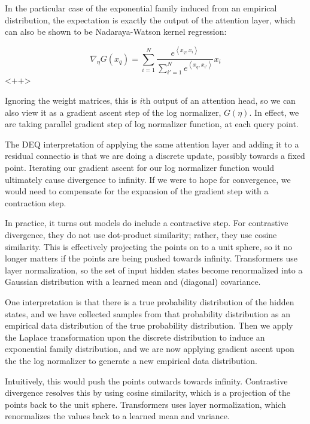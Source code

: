 \documentclass[a4paper]{article}
\begin{document}
In the particular case of the exponential family induced from an empirical distribution, the expectation is exactly the output of the attention layer, which can also be shown to be Nadaraya-Watson kernel regression:

\begin{equation}
  \nabla_{\eta} G(x_q) = \sum_{i=1}^N \frac{ e^{\left< x_q, x_i \right> } }{\sum_{i'=1}^N e^{\left<x_q,x_{i'} \right>} } x_i
  \label{<++>}
\end{equation}<++>

Ignoring the weight matrices, this is $i$th output of an attention head, so we can also view it as a gradient ascent step of the log normalizer, $G(\eta)$.  
In effect, we are taking parallel gradient step of log normalizer function, at each query point.

The DEQ interpretation of applying the same attention layer and adding it to a residual connectio is that we are doing a discrete update, possibly towards a fixed point.  
Iterating our gradient ascent for our log normalizer function would ultimately cause divergence to infinity.  
If we were to hope for convergence, we would need to compensate for the expansion of the gradient step with a contraction step.

In practice, it turns out models do include a contractive step.  
For contrastive divergence, they do not use dot-product similarity; rather, they use cosine similarity.  
This is effectively projecting the points on to a unit sphere, so it no longer matters if the points are being pushed towards infinity.
Transformers use layer normalization, so the set of input hidden states become renormalized into a Gaussian distribution with a learned mean and (diagonal) covariance.  




One interpretation is that there is a true probability distribution of the hidden states, and we have collected samples from that probability distribution as an empirical data distribution of the true probability distribution.  Then we apply the Laplace transformation upon the discrete distribution to induce an exponential family distribution, and we are now applying gradient ascent upon the the log normalizer to generate a new empirical data distribution.

Intuitively, this would push the points outwards towards infinity.  Contrastive divergence resolves this by using cosine similarity, which is a projection of the points back to the unit sphere.  Transformers uses layer normalization, which renormalizes the values back to a learned mean and variance.
\end{document}
